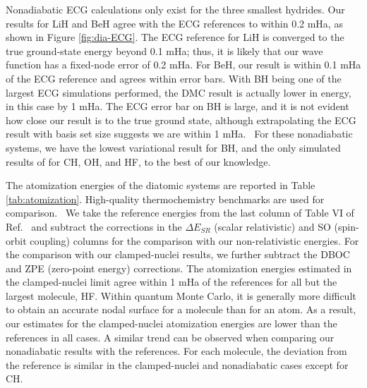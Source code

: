 Nonadiabatic ECG calculations only exist for the three smallest hydrides. Our results for LiH and BeH agree with the ECG references to within 0.2 mHa, as shown in Figure \ref{fig:dia-ECG}. The ECG reference for LiH is converged to the true ground-state energy beyond 0.1 mHa; thus, it is likely that our wave function has a fixed-node error of 0.2 mHa. For BeH, our result is within 0.1 mHa of the ECG reference and agrees within error bars. With BH being one of the largest ECG simulations performed, the DMC result is actually lower in energy, in this case by 1 mHa. The ECG error bar on BH is large, and it is not evident how close our result is to the true ground state, although extrapolating the ECG result with basis set size suggests we are within 1 mHa.~\cite{Bubin_BeH_noBO} For these nonadiabatic systems, we have the lowest variational result for BH, and the only simulated results of for CH, OH, and HF, to the best of our knowledge.

The atomization energies of the diatomic systems are reported in Table \ref{tab:atomization}. High-quality thermochemistry benchmarks are used for comparison.~\cite{Feller_Corrections} We take the reference energies from the last column of Table VI of Ref.~\cite{Feller_Corrections} and subtract the corrections in the $\Delta E_{SR}$ (scalar relativistic) and SO (spin-orbit coupling) columns for the comparison with our non-relativistic energies. For the comparison with our clamped-nuclei results, we further subtract the DBOC and ZPE (zero-point energy) corrections.
The atomization energies estimated in the clamped-nuclei limit agree within 1 mHa of the references for all but the largest molecule, HF. Within quantum Monte Carlo, it is generally more difficult to obtain an accurate nodal surface for a molecule than for an atom. As a result, our estimates for the clamped-nuclei atomization energies are lower than the references in all cases. A similar trend can be observed when comparing our nonadiabatic results with the references. For each molecule, the deviation from the reference is similar in the clamped-nuclei and nonadiabatic cases except for CH.

